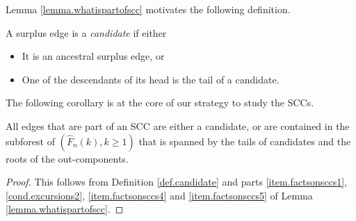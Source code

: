 Lemma \ref{lemma.whatispartofscc} motivates the following definition.
\begin{definition}\label{def.candidate}
A surplus edge is a \emph{candidate} if either
\begin{itemize}
    \item It is an ancestral surplus edge, or
    \item One of the descendants of its head is the tail of a candidate.
\end{itemize}
\end{definition}
The following corollary is at the core of our strategy to study the SCCs.
\begin{corollary}\label{cor.edgesinSCCs}
All edges that are part of an SCC are either a candidate, or are contained in the subforest of $(\hat{F}_n(k),k\geq 1)$ that is spanned by the tails of candidates and the roots of the out-components.
\end{corollary}
\begin{proof}
This follows from Definition \ref{def.candidate} and parts \ref{item.factsonsccs1}, \ref{cond.excursions2}, \ref{item.factsonsccs4} and \ref{item.factsonsccs5} of Lemma \ref{lemma.whatispartofscc}.
\end{proof}
